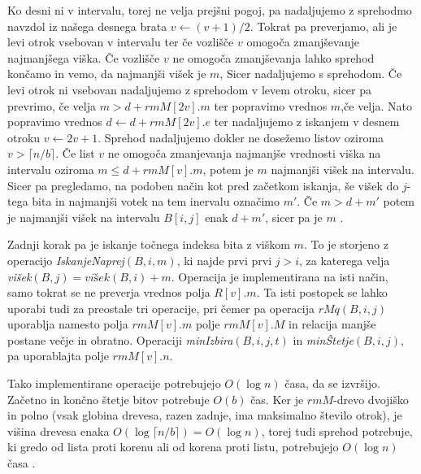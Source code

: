 Ko desni ni v intervalu, torej ne velja prejšni pogoj, pa nadaljujemo z sprehodmo navzdol iz našega desnega brata $v\leftarrow (v+1)/2$. Tokrat pa preverjamo, ali je levi otrok vsebovan v intervalu ter če vozlišče $v$ omogoča zmanjševanje najmanjšega viška. Če vozlišče $v$ ne omogoča zmanjševanja lahko sprehod končamo in vemo, da najmanjši višek je $m$, Sicer nadaljujemo s sprehodom. Če levi otrok ni vsebovan nadaljujemo z sprehodom v levem otroku, sicer pa prevrimo, če velja $m>d+rmM[2v].m$ ter popravimo vrednos $m$,če velja. Nato popravimo vrednos $d\leftarrow d+rmM[2v].e$ ter nadaljujemo z iskanjem v desnem otroku $v\leftarrow 2v+1$. Sprehod nadaljujemo dokler ne dosežemo listov oziroma $v>\lceil n/b\rceil$. Če list $v$ ne omogoča zmanjevanja najmanjše vrednosti viška na intervalu oziroma $m\le d+rmM[v].m$, potem je $m$ najmanjši višek na intervalu. Sicer pa pregledamo, na podoben način kot pred začetkom iskanja, še višek do $j$-tega bita in najmanjši votek na tem inervalu označimo $m'$. Če $m>d+m'$ potem je najmanjši višek na intervalu $B[i,j]$ enak $d+m'$, sicer pa je $m$ \cite{Navarro2016}. 

Zadnji korak pa je iskanje točnega indeksa bita z viškom $m$. To je storjeno z operacijo \textit{IskanjeNaprej}$(B,i,m)$, ki najde prvi prvi $j> i$, za katerega velja \textit{višek}$(B,j)=\textit{višek}(B,i)+m$. Operacija je implementirana na isti način, samo tokrat se ne preverja vrednos polja $R[v].m$. Ta isti  postopek se lahko uporabi tudi za preostale tri operacije, pri čemer pa operacija $rMq(B,i,j)$ uporablja namesto polja $rmM[v].m$ polje $rmM[v].M$ in relacija manjše postane večje in obratno. Operaciji \textit{minIzbira}$(B,i,j,t)$ in \textit{minŠtetje}$(B,i,j)$, pa uporablajta polje $rmM[v].n$\cite{Navarro2016}.

Tako implementirane operacije potrebujejo $O(\log{n})$ časa, da se izvršijo. Začetno in končno štetje bitov potrebuje $O(b)$ čas. Ker je $rmM$-drevo dvojiško in polno (vsak globina drevesa, razen zadnje, ima maksimalno število otrok),  je višina drevesa enaka $O(\log{\lceil n/b\rceil})=O(\log{n})$, torej tudi sprehod potrebuje, ki gredo od lista proti korenu ali od korena proti listu, potrebujejo $O(\log{n})$ časa \cite{Navarro2016}.